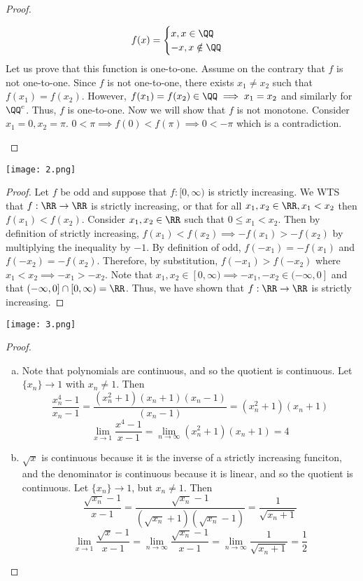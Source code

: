 \documentclass[12pt]{scrartcl}
\begin{document}
\begin{proof}
\begin{enumerate}[a.]
    \[f(x) = \begin{cases}
      x, x \in \QQ \\ 
      -x, x \notin \QQ
    \end{cases}\]
    Let us prove that this function is one-to-one. Assume on the contrary that $f$ is not one-to-one. 
    Since $f$ is not one-to-one, there exists $x_1 \neq x_2$ such that $f(x_1) = f(x_2)$.
    However, $f(x_1) = f(x_2) \in \QQ \implies x_1 = x_2$ and similarly for $\QQ^c$. Thus, $f$ is 
    one-to-one. Now we will show that $f$ is not monotone. Consider $x_1 = 0, x_2 = \pi$.
    $0 < \pi \implies f(0) < f(\pi) \implies 0 < -\pi$ which is a contradiction.
  \end{enumerate}
\end{proof}

\newpage

\texttt{[image: 2.png]}

\begin{proof}
  Let $f$ be odd and suppose that $f: [0, \infty)$ is strictly increasing. We WTS 
  that $f: \RR \to \RR$ is strictly increasing, or that for all $x_1, x_2 \in \RR, x_1 < x_2$ then $f(x_1) < f(x_2)$.
  Consider $x_1, x_2 \in \RR$ such that $0 \leq x_1 < x_2$. Then by definition of strictly increasing, 
  $f(x_1) < f(x_2) \implies -f(x_1) > -f(x_2)$ by multiplying the inequality 
  by $-1$. By definition of odd, $f(-x_1) = -f(x_1)$ and 
  $f(-x_2) = -f(x_2)$. Therefore, by substitution, $f(-x_1) > f(-x_2)$ where $x_1 < x_2 \implies -x_1 > -x_2$. Note that 
  $x_1, x_2 \in [0, \infty) \implies -x_1, -x_2 \in (-\infty, 0]$ and that $(-\infty, 0] \cap [0, \infty) = \RR$. 
  Thus, we have shown that $f: \RR \to \RR$ is strictly increasing.
\end{proof}

\newpage

\texttt{[image: 3.png]}

\begin{proof}
  
  \hfill

  \begin{enumerate}[a.]
    \item Note that polynomials are continuous, and so the quotient is continuous. Let $\{x_n\} \to 1$
    with $x_n \neq 1$. Then 
    \[\dfrac{x_n^4 - 1}{x_n - 1} = \dfrac{(x_n^2 + 1)(x_n + 1) (x_n - 1)}{(x_n - 1)} = (x_n^2 + 1)(x_n + 1)\]
    \[\lim_{x\to 1} \dfrac{x^4 - 1}{x - 1} = \lim_{n\to\infty}(x_n^2 + 1)(x_n + 1) = 4\]
    
    \item $\sqrt{x}$ is continuous because it is the inverse of a strictly increasing funciton, and the denominator 
    is continuous because it is linear, and so the quotient is continuous. Let $\{x_n\} \to 1$, but $x_n \neq 1$. 
    Then 
    \[\dfrac{\sqrt{x_n} - 1}{x - 1} = \dfrac{\sqrt{x_n} - 1}{(\sqrt{x_n} + 1)(\sqrt{x_n} - 1)} = \dfrac{1}{\sqrt{x_n + 1}}\]
    \[\lim_{x \to 1}\dfrac{\sqrt{x} - 1}{x - 1} = \lim_{n\to\infty} \dfrac{\sqrt{x_n} - 1}{x - 1} = \lim_{n\to\infty} \frac{1}{\sqrt{x_n + 1}} = \frac{1}{2}\]
  \end{enumerate}

\end{proof}
\end{document}
